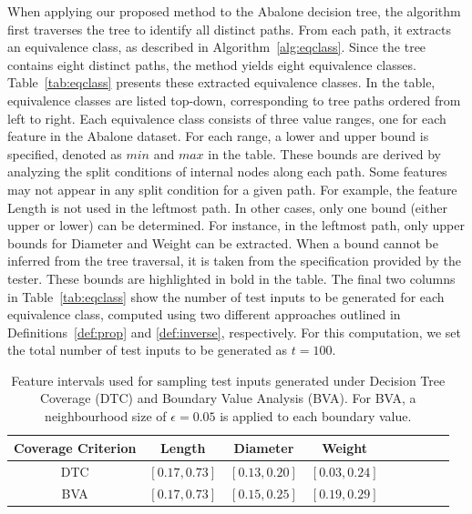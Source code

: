 \documentclass[
]{ceurart}
\theoremstyle{definition}
\begin{document}
When applying our proposed method to the Abalone decision tree, the algorithm first traverses the tree to identify all distinct paths. From each path, it extracts an equivalence class, as described in Algorithm~\ref{alg:eqclass}. Since the tree contains eight distinct paths, the method yields eight equivalence classes. Table~\ref{tab:eqclass} presents these extracted equivalence classes. In the table, equivalence classes are listed top-down, corresponding to tree paths ordered from left to right. Each equivalence class consists of three value ranges, one for each feature in the Abalone dataset. For each range, a lower and upper bound is specified, denoted as $min$ and $max$ in the table. These bounds are derived by analyzing the split conditions of internal nodes along each path. Some features may not appear in any split condition for a given path. For example, the feature Length is not used in the leftmost path. In other cases, only one bound (either upper or lower) can be determined. For instance, in the leftmost path, only upper bounds for Diameter and Weight can be extracted. When a bound cannot be inferred from the tree traversal, it is taken from the specification provided by the tester. These bounds are highlighted in bold in the table. The final two columns in Table~\ref{tab:eqclass} show the number of test inputs to be generated for each equivalence class, computed using two different approaches outlined in Definitions~\ref{def:prop} and \ref{def:inverse}, respectively. For this computation, we set the total number of test inputs to be generated as $t = 100$.

\begin{table}
\caption{Feature intervals used for sampling test inputs generated under Decision Tree Coverage (DTC) and Boundary Value Analysis (BVA). For BVA, a neighbourhood size of $\epsilon = 0.05$ is applied to each boundary value.}
\label{tab:interval}
\begin{tabular}{ccccccccc}\toprule
Coverage Criterion & Length & Diameter  &Weight \\\midrule
DTC    &  $[0.17, 0.73]$ & $[0.13, 0.20]$ & $[0.03, 0.24]$ \\
BVA   & $[0.17, 0.73]$ & $[0.15, 0.25]$ & $[0.19, 0.29]$ \\\bottomrule
\end{tabular}
\end{table}
\end{document}
